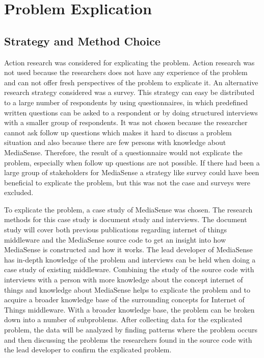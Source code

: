 \section{Problem Explication}
\subsection{Strategy and Method Choice}
Action research was considered for explicating the problem. Action research was not used because the researchers does not have any experience of the problem and can not offer fresh perspectives of the problem to explicate it. An alternative research strategy considered was a survey. This strategy can easy be distributed to a large number of respondents by using questionnaires, in which predefined written questions can be asked to a respondent or by doing structured interviews with a smaller group of respondents. It was not chosen because the researcher cannot ask follow up questions which makes it hard to discuss a problem situation and also because there are few persons with knowledge about MediaSense. Therefore, the result of a questionnaire would not explicate the problem, especially when follow up questions are not possible. If there had been a large group of stakeholders for MediaSense a strategy like survey could have been beneficial to explicate the problem, but this was not the case and surveys were excluded.

To explicate the problem, a case study of MediaSense was chosen. The research methods for this case study is document study and interviews. The document study will cover both previous publications regarding internet of things middleware and the MediaSense source code to get an insight into how MediaSense is constructed and how it works. The lead developer of MediaSense has in-depth knowledge of the problem and interviews can be held when doing a case study of existing middleware. Combining the study of the source code with interviews with a person with more knowledge about the concept internet of things and knowledge about MediaSense helps to explicate the problem and to acquire a broader knowledge base of the surrounding concepts for Internet of Things middleware. With a broader knowledge base, the problem can be broken down into a number of subproblems. After collecting data for the explicated problem, the data will be analyzed by finding patterns where the problem occurs and then discussing the problems the researchers found in the source code with the lead developer to confirm the explicated problem. 

